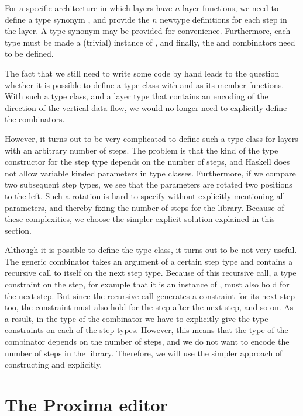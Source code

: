 \documentclass[preprint,natbib]{sigplanconf}
\begin{document}
For a specific architecture in which layers have $n$ layer functions, we need to define a type synonym , and provide the $n$ newtype definitions  for each step in the layer. A type synonym  may be provided for convenience. Furthermore, each type  must be made a (trivial) instance of , and finally, the  and  combinators need to be defined.

The fact that we still need to write some code by hand leads to the question whether it is possible to define a type class with   and  as its member functions. With such a type class, and a layer type that contains an encoding of the direction of the vertical data flow, we would no longer need to explicitly define the combinators.


However, it turns out to be very complicated to define such a type class for layers with an arbitrary number of steps. The problem is that the kind of the type constructor for the step type depends on the number of steps, and Haskell does not allow variable kinded parameters in type classes. Furthermore, if we compare two subsequent step types, we see that the parameters are rotated two positions to the left. Such a rotation is hard to specify without explicitly mentioning all parameters, and thereby fixing the number of steps for the library. Because of these complexities, we choose the simpler explicit solution explained in this section.


\bc Although it is possible to define the type class, it turns out to be not very useful. The generic combinator takes an argument of a certain step type and contains a recursive call to itself on the next step type. Because of this recursive call, a type constraint on the step, for example that it is an instance of , must also hold for the next step. But since the recursive call generates a constraint for its next step too, the constraint must also hold for the step after the next step, and so on. As a result, in the type of the combinator we have to explicitly give the type constraints on each of the step types. However, this means that the type of the combinator depends on the number of steps, and we do not want to encode the number of steps in the library. Therefore, we will use the simpler approach of constructing  and  explicitly. \ec






%																
%																
%																
\section{The Proxima editor} \label{sect:proxima}
\end{document}

